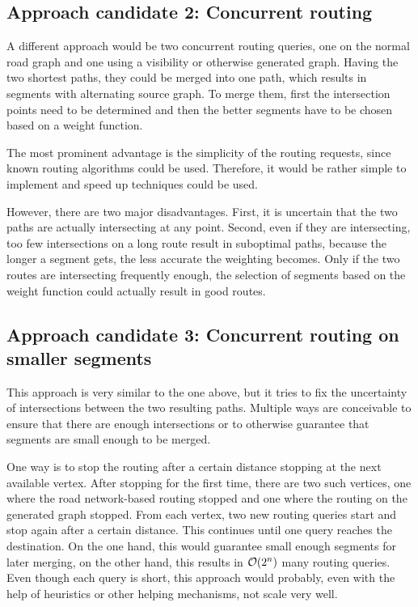 	\subsection{Approach candidate 2: Concurrent routing}
	
		A different approach would be two concurrent routing queries, one on the normal road graph and one using a visibility or otherwise generated graph.
		Having the two shortest paths, they could be merged into one path, which results in segments with alternating source graph.
		To merge them, first the intersection points need to be determined and then the better segments have to be chosen based on a weight function.
		
		The most prominent advantage is the simplicity of the routing requests, since known routing algorithms could be used.
		Therefore, it would be rather simple to implement and speed up techniques could be used.
		
		However, there are two major disadvantages.
		First, it is uncertain that the two paths are actually intersecting at any point.
		Second, even if they are intersecting, too few intersections on a long route result in suboptimal paths, because the longer a segment gets, the less accurate the weighting becomes.
		Only if the two routes are intersecting frequently enough, the selection of segments based on the weight function could actually result in good routes.
	
	\subsection{Approach candidate 3: Concurrent routing on smaller segments}
	
		This approach is very similar to the one above, but it tries to fix the uncertainty of intersections between the two resulting paths.
		Multiple ways are conceivable to ensure that there are enough intersections or to otherwise guarantee that segments are small enough to be merged.
		
		One way is to stop the routing after a certain distance stopping at the next available vertex.
		After stopping for the first time, there are two such vertices, one where the road network-based routing stopped and one where the routing on the generated graph stopped.
		From each vertex, two new routing queries start and stop again after a certain distance.
		This continues until one query reaches the destination.
		On the one hand, this would guarantee small enough segments for later merging, on the other hand, this results in $\mathcal{O}(2^n)$ many routing queries.
		Even though each query is short, this approach would probably, even with the help of heuristics or other helping mechanisms, not scale very well.
		
